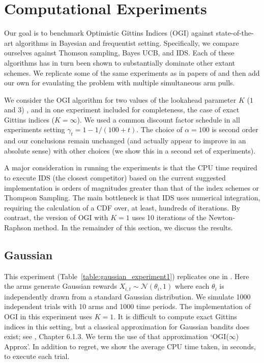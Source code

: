 \section{Computational Experiments} \label{sec:experiments}
Our goal is to benchmark Optimistic Gittins Indices (OGI) against state-of-the-art algorithms in Bayesian and frequentist setting. Specifically, we compare ourselves against Thomson sampling, Bayes UCB, and IDS. Each of these algorithms has in turn been shown to substantially dominate other extant schemes. We replicate some of the same experiments as in papers of \cite{russo2014learning,kaufmann2012thompson} and then add our own for evaulating the problem with multiple simultaneous arm pulls.  

We consider the OGI algorithm for two values of the lookahead parameter $K$ ($1$ and $3$) , and in one experiment included for completeness, the case of exact Gittins indices ($K=\infty$). We used a common discount factor schedule in all experiments setting $\gamma_t = 1 - 1/(100 + t)$. The choice of $\alpha = 100$ is second order and our conclusions remain unchanged (and actually appear to improve in an absolute sense) with other choices (we show this in a second set of experiments). 

A major consideration in running the experiments is that the CPU time required to execute IDS (the closest competitor) based on the current suggested implementation is orders of magnitudes greater than that of the index schemes or Thompson Sampling. The main bottleneck is that IDS uses numerical integration,  requiring the calculation of a CDF over, at least, hundreds of iterations. By contrast, the version of OGI with $K=1$ uses 10 iterations of the Newton-Raphson method. In the remainder of this section, we discuss the results.

\subsection{Gaussian}
This experiment (Table~\ref{table:gaussian_experiment1}) replicates one in \cite{russo2014learning}. Here the arms generate Gaussian rewards  $X_{i,t} \sim \mathcal{N}(\theta_i, 1)$ where each $\theta_i$ is independently drawn from a standard Gaussian distribution. We simulate 1000 independent trials with 10 arms and 1000 time periods. The implementation of OGI in this experiment uses $K = 1$. It is difficult to compute exact Gittins indices in this setting, but a classical approximation for Gaussian bandits does exist; see \cite{powell2012optimal}, Chapter 6.1.3. We term the use of that approximation `OGI($\infty$) Approx'.  In addition to regret, we  show the average CPU time taken, in seconds, to execute each trial.

